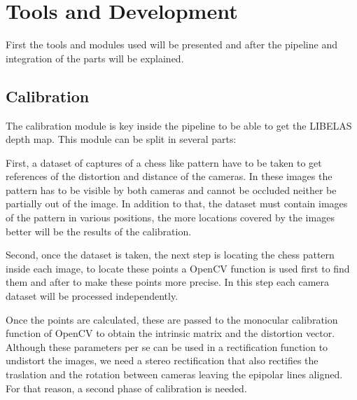 \documentclass[10pt,a4paper,twocolumn,twoside]{article}
\begin{document}
	
	
	
	\section{Tools and Development}
	
	First the tools and modules used will be presented and after the pipeline and integration of the parts will be explained. 
	
	\subsection{Calibration}
	
	The calibration module is key inside the pipeline to be able to get the LIBELAS depth map. This module can be split in several parts:  
	
	First, a dataset of captures of a chess like pattern have to be taken to get references of the distortion and distance of the cameras. In these images the pattern has to be visible by both cameras and cannot be occluded neither be partially out of the image. In addition to that, the dataset must contain images of the pattern in various positions, the more locations covered by the images better will be the results of the calibration. 
	
	Second, once the dataset is taken, the next step is locating the chess pattern inside each image, to locate these points a OpenCV function is used first to find them and after to make these points more precise. In this step each camera dataset will be processed independently. 
	
	Once the points are calculated, these are passed to the monocular calibration function of OpenCV to obtain the intrinsic matrix and the distortion vector.  Although these parameters per se can be used in a rectification function to undistort the images, we need a stereo rectification that also rectifies the traslation and the rotation between cameras leaving the epipolar lines aligned. For that reason, a second phase of calibration is needed. 
	
\end{document}
